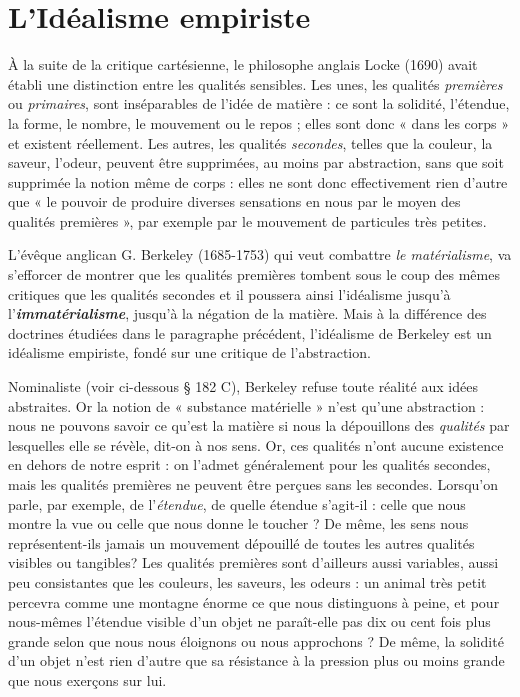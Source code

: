 \section{L’Idéalisme empiriste}%
À la suite de la critique cartésienne,
le philosophe anglais Locke (1690) avait établi une distinction
entre les qualités sensibles. Les unes, les qualités {\it premières} ou {\it primaires},
sont inséparables de l’idée de matière : ce sont la solidité,
l'étendue, la forme, le nombre, le mouvement ou le repos ; elles sont
donc « dans les corps »
et existent réellement.
Les autres, les qualités {\it secondes}, telles
que la couleur, la
saveur, l'odeur, peuvent être supprimées,
au moins par abstraction, sans que soit
supprimée la notion
même de corps : elles
ne sont donc effectivement rien d’autre
que « le pouvoir de
produire diverses sensations en nous par
le moyen des qualités premières », par
exemple par le mouvement de particules
très petites.

L'évêque  anglican
G. Berkeley (1685-1753)
qui veut combattre
{\it le matérialisme}, va s’efforcer de montrer que les qualités premières
tombent sous le coup des mêmes critiques que les qualités
secondes et il poussera ainsi l’idéalisme jusqu’à l’\textbf{\textit {immatérialisme}},
jusqu’à la négation de la matière. Mais à la différence des doctrines
étudiées dans le paragraphe précédent, l’idéalisme de Berkeley est un
idéalisme empiriste, fondé sur une critique de l’abstraction.

Nominaliste (voir ci-dessous § 182 C), Berkeley refuse toute réalité aux
idées abstraites. Or la notion de « substance matérielle » n’est qu'une abstraction :
nous ne pouvons savoir ce qu'est la matière si nous la dépouillons
des {\it qualités} par lesquelles elle se révèle, dit-on à nos sens. Or, ces qualités
n'ont aucune existence en dehors de notre esprit : on l’admet généralement
pour les qualités secondes, mais les qualités premières ne peuvent être
perçues sans les secondes. Lorsqu'on parle, par exemple, de l'{\it étendue}, de
quelle étendue s’agit-il : celle que nous montre la vue ou celle que nous donne
le toucher ? De même, les sens nous représentent-ils jamais un mouvement
dépouillé de toutes les autres qualités visibles ou tangibles? Les qualités
premières sont d’ailleurs aussi variables, aussi peu consistantes que les couleurs,
les saveurs, les odeurs : un animal très petit percevra comme une
montagne énorme ce que nous distinguons à peine, et pour nous-mêmes
l'étendue visible d’un objet ne paraît-elle pas dix ou cent fois plus grande
selon que nous nous éloignons ou nous approchons ? De même, la solidité
d'un objet n’est rien d'autre que sa résistance à la pression plus ou moins
grande que nous exerçons sur lui.

